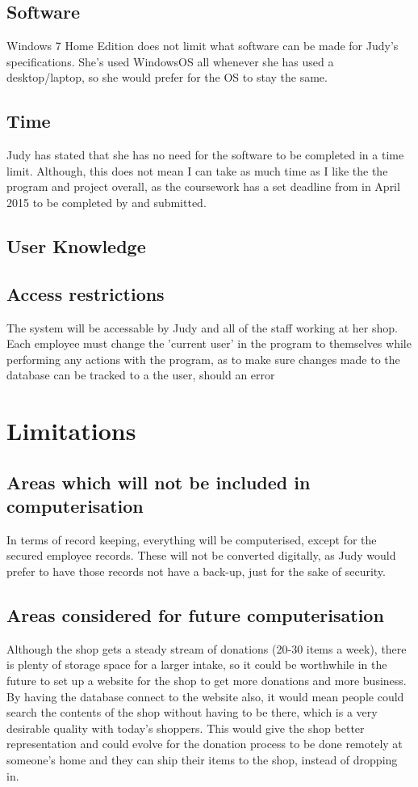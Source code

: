 \subsection{Software}
Windows 7 Home Edition does not limit what software can be made for Judy's specifications. She's used WindowsOS all whenever she has used a desktop/laptop, so she would prefer for the OS to stay the same.

\subsection{Time}
Judy has stated that she has no need for the software to be completed in a time limit. Although, this does not mean I can take as much time as I like the the program and project overall, as the coursework has a set deadline from in April 2015 to be completed by and submitted.
\subsection{User Knowledge}

\subsection{Access restrictions}
The system will be accessable by Judy and all of the staff working at her shop. Each employee must change the 'current user' in the program to themselves while performing any actions with the program, as to make sure changes made to the database can be tracked to a the user, should an error 

\section{Limitations}

\subsection{Areas which will not be included in computerisation}
In terms of record keeping, everything will be computerised, except for the secured employee records. These will not be converted digitally, as Judy would prefer to have those records not have a back-up, just for the sake of security.


\subsection{Areas considered for future computerisation}
Although the shop gets a steady stream of donations (20-30 items a week), there is plenty of storage space for a larger intake, so it could be worthwhile in the future to set up a website for the shop to get more donations and more business. By having the database connect to the website also, it would mean people could search the contents of the shop without having to be there, which is a very desirable quality with today’s shoppers. This would give the shop better representation and could evolve for the donation process to be done remotely at someone’s home and they can ship their items to the shop, instead of dropping in.

